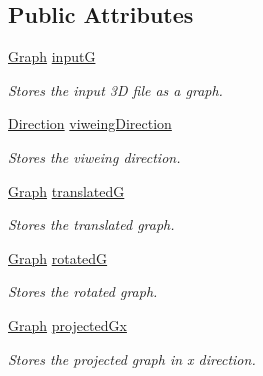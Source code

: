 \subsection*{Public Attributes}
\begin{DoxyCompactItemize}
\item 
\mbox{\label{classthreeto2d_aa12f0e10eb082b543dda99ab7b6fd4ab}} 
\mbox{\hyperlink{class_graph}{Graph}} \mbox{\hyperlink{classthreeto2d_aa12f0e10eb082b543dda99ab7b6fd4ab}{inputG}}
\begin{DoxyCompactList}\small\item\em Stores the input 3D file as a graph. \end{DoxyCompactList}\item 
\mbox{\label{classthreeto2d_a82de4b8ed23967d57a1905bf9fc1011c}} 
\mbox{\hyperlink{struct_direction}{Direction}} \mbox{\hyperlink{classthreeto2d_a82de4b8ed23967d57a1905bf9fc1011c}{viweing\+Direction}}
\begin{DoxyCompactList}\small\item\em Stores the viweing direction. \end{DoxyCompactList}\item 
\mbox{\label{classthreeto2d_a35e3f8899eaa2592ef47a5c8cd45e450}} 
\mbox{\hyperlink{class_graph}{Graph}} \mbox{\hyperlink{classthreeto2d_a35e3f8899eaa2592ef47a5c8cd45e450}{translatedG}}
\begin{DoxyCompactList}\small\item\em Stores the translated graph. \end{DoxyCompactList}\item 
\mbox{\label{classthreeto2d_adbb810a431abf950a12f7f3731253287}} 
\mbox{\hyperlink{class_graph}{Graph}} \mbox{\hyperlink{classthreeto2d_adbb810a431abf950a12f7f3731253287}{rotatedG}}
\begin{DoxyCompactList}\small\item\em Stores the rotated graph. \end{DoxyCompactList}\item 
\mbox{\label{classthreeto2d_a1ad64c7fceb72643d7373cfb700625c8}} 
\mbox{\hyperlink{class_graph}{Graph}} \mbox{\hyperlink{classthreeto2d_a1ad64c7fceb72643d7373cfb700625c8}{projected\+Gx}}
\begin{DoxyCompactList}\small\item\em Stores the projected graph in x direction. \end{DoxyCompactList}\item 

\end{DoxyCompactItemize}
